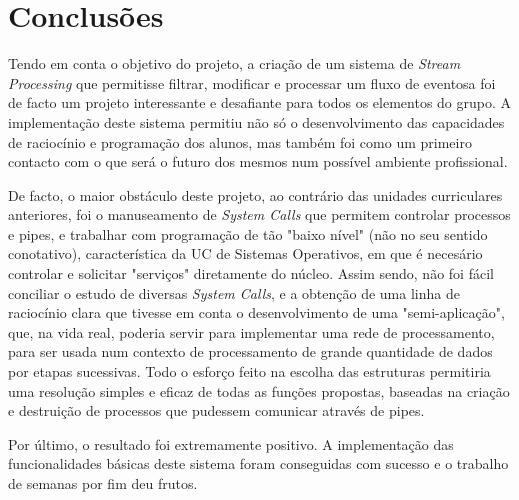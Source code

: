 \documentclass[a4paper]{article}
\begin{document}
\section{Conclusões}
\label{sec:6}

\hspace{3mm} Tendo em conta o objetivo do projeto, a criação de um sistema de \emph{Stream Processing} que permitisse filtrar, modificar e processar um fluxo de eventosa foi de facto um projeto interessante e desafiante para todos os elementos do grupo. A implementação deste sistema permitiu não só o desenvolvimento das capacidades de raciocínio e programação dos alunos, mas também foi como um primeiro contacto com o que será o futuro dos mesmos num possível ambiente profissional. 
\par De facto, o maior obstáculo deste projeto, ao contrário das unidades curriculares anteriores, foi o manuseamento de \emph{System Calls} que permitem controlar processos e pipes, e trabalhar com programação de tão "baixo nível" (não no seu sentido conotativo), característica da UC de Sistemas Operativos, em que é necesário controlar e solicitar "serviços" diretamente do núcleo. Assim sendo, não foi fácil conciliar o estudo de diversas \emph{System Calls}, e a obtenção de uma linha de raciocínio clara que tivesse em conta o desenvolvimento de uma "semi-aplicação", que, na vida real, poderia servir para implementar uma rede de processamento, para ser usada  num contexto de processamento de grande quantidade de dados por etapas sucessivas. Todo o esforço feito na escolha das estruturas permitiria uma resolução simples e eficaz de todas as funções propostas, baseadas na criação e destruição de processos que pudessem comunicar através de pipes.
\par Por último, o resultado foi extremamente positivo. A implementação das funcionalidades básicas deste sistema foram conseguidas com sucesso e o trabalho de semanas por fim deu frutos.
\end{document}
